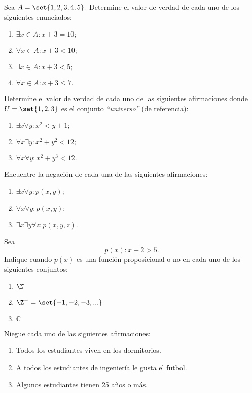 

\begin{problema}
	Sea $A=\set{1,2,3,4,5}.$ Determine el valor de verdad de cada uno de los siguientes enunciados:
	\begin{enumerate}
		\item $\exists x \in A: x+3=10;$ 
		\item $\forall x \in A: x+3<10;$ 
		\item $\exists x \in A: x+3<5;$ 
		\item $\forall x \in A: x+3 \leq 7.$
	\end{enumerate}
	
\end{problema}




\begin{problema}
	Determine el valor de verdad de cada uno de las siguientes afirmaciones donde $U=\set{1,2,3}$ es el conjunto \emph{``universo''} (de referencia):
	\begin{enumerate}
		\item $\exists x \forall y: x^{2}< y+1;$ 
		\item $\forall x \exists y: x^{2}+y^{2}<12;$ 
		\item $\forall x \forall y: x^{2}+y^{3}<12.$
	\end{enumerate}
	
\end{problema}




\begin{problema}
	Encuentre la negación de cada una de las siguientes afirmaciones:
	\begin{enumerate}
		\item $\exists x \forall y: p(x,y);$ 
		\item $\forall x \forall y: p(x,y);$ 
		\item $\exists x \exists y \forall z: p(x,y,z).$
	\end{enumerate}
	
\end{problema}




\begin{problema}
	Sea $$p(x): x+2>5.$$ Indique cuando $p(x)$ es una función proposicional o no en cada uno de los siguientes conjuntos: 
	\begin{enumerate}
		\item $\N$ 
		\item $\Z^{-}=\set{-1,-2,-3,...}$ 
		\item $\mathbb{C}$
	\end{enumerate}
	
\end{problema}




\begin{problema}
	Niegue cada uno de las siguientes afirmaciones:
	\begin{enumerate}
		\item Todos los estudiantes viven en los dormitorios.
		\item A todos los estudiantes de ingeniería le gusta el futbol.
		\item Algunos estudiantes tienen 25 años o más.
	\end{enumerate}
\end{problema}
